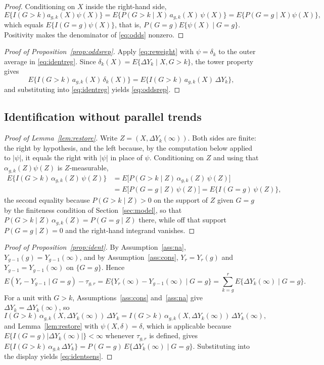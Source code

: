 \documentclass[12pt]{article}
\theoremstyle{remark}
\begin{document}
\begin{proof}
Conditioning on $X$ inside the right-hand side,
\[
E\{I(G>k) a_{g,k}(X)\psi(X)\} = E\{P(G>k \mid X)\, a_{g,k}(X)\,\psi(X)\}
 = E\{P(G{=}g \mid X)\psi(X)\},
\]
which equals $E\{I(G{=}g)\psi(X)\}$, that is,
$P(G{=}g)E\{\psi(X) \mid G{=}g\}$. Positivity makes the denominator of
\eqref{eq:odds} nonzero.
\end{proof}

\begin{proof}[Proof of Proposition~\ref{prop:oddsrep}]
Apply \eqref{eq:reweight} with $\psi = \delta_k$ to the outer average in
\eqref{eq:identreg}. Since $\delta_k(X) = E\{\Delta Y_k \mid X, G > k\}$, the tower
property gives
\[
E\{I(G{>}k)\,a_{g,k}(X)\,\delta_k(X)\} = E\{I(G{>}k)\,a_{g,k}(X)\,\Delta Y_k\},
\]
and substituting into \eqref{eq:identreg} yields \eqref{eq:oddsrep}.
\end{proof}

\subsection{Identification without parallel trends}

\begin{proof}[Proof of Lemma~\ref{lem:restore}]
Write $Z = (X, \Delta Y_k(\infty))$. Both sides are finite: the right by hypothesis, and
the left because, by the computation below applied to $|\psi|$, it equals the right with
$|\psi|$ in place of $\psi$. Conditioning on $Z$ and using that $\alpha_{g,k}(Z)\psi(Z)$
is $Z$-measurable,
\begin{align*}
E\{I(G{>}k)\,\alpha_{g,k}(Z)\,\psi(Z)\}
&= E\big[ P(G{>}k \mid Z)\,\alpha_{g,k}(Z)\,\psi(Z) \big]\\
&= E\big[ P(G{=}g \mid Z)\,\psi(Z) \big]
= E\{I(G{=}g)\,\psi(Z)\},
\end{align*}
the second equality because $P(G{>}k \mid Z) > 0$ on the support of $Z$ given $G = g$ by
the finiteness condition of Section~\ref{sec:model}, so that
$P(G{>}k \mid Z)\,\alpha_{g,k}(Z) = P(G{=}g \mid Z)$ there, while off that support
$P(G{=}g \mid Z) = 0$ and the right-hand integrand vanishes.
\end{proof}

\begin{proof}[Proof of Proposition~\ref{prop:ident}]
By Assumption~\ref{ass:na}, $Y_{g-1}(g) = Y_{g-1}(\infty)$, and by
Assumption~\ref{ass:cons}, $Y_r = Y_r(g)$ and $Y_{g-1} = Y_{g-1}(\infty)$ on $\{G = g\}$.
Hence
\[
E(Y_r - Y_{g-1} \mid G{=}g) - \tau_{g,r}
= E\{Y_r(\infty) - Y_{g-1}(\infty) \mid G{=}g\}
= \sum_{k=g}^{r} E\{\Delta Y_k(\infty) \mid G{=}g\}.
\]
For a unit with $G > k$, Assumptions~\ref{ass:cons} and~\ref{ass:na} give
$\Delta Y_k = \Delta Y_k(\infty)$, so
\[
I(G{>}k)\,\alpha_{g,k}(X, \Delta Y_k(\infty))\,\Delta Y_k
 = I(G{>}k)\,\alpha_{g,k}(X, \Delta Y_k(\infty))\,\Delta Y_k(\infty),
\]
and Lemma~\ref{lem:restore} with $\psi(X,\delta) = \delta$, which is applicable because
$E\{I(G{=}g)|\Delta Y_k(\infty)|\} < \infty$ whenever $\tau_{g,r}$ is defined, gives
$E\{I(G{>}k)\,\alpha_{g,k}\,\Delta Y_k\} = P(G{=}g)\,E\{\Delta Y_k(\infty) \mid G{=}g\}$.
Substituting into the display yields \eqref{eq:identsens}.
\end{proof}
\end{document}
